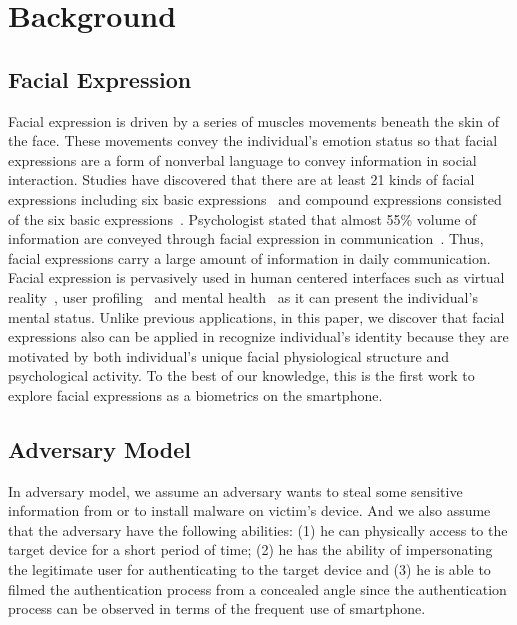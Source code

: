 \section{Background}
    \subsection{Facial Expression}
        Facial expression is driven by a series of muscles movements beneath the skin of the face. These movements convey the individual's emotion status so that facial expressions are a form of nonverbal language to convey information in social interaction. Studies have discovered that there are at least 21 kinds of facial expressions including six basic expressions~\cite{Ekman1972} and compound expressions consisted of the six basic expressions~\cite{Du2014Compound}. Psychologist stated that almost 55\% volume of information are conveyed through facial expression in communication~\cite{Lebow2009Communication}. Thus, facial expressions carry a large amount of information in daily communication. Facial expression is pervasively used in human centered interfaces such as virtual reality~\cite{Bekele2013Understanding}, user profiling~\cite{Arapakis2009Integrating} and mental health~\cite{Acharya2012Impact} as it can present the individual's mental status. Unlike previous applications, in this paper, we discover that facial expressions also can be applied in recognize individual's identity because they are motivated by both individual's unique facial physiological structure and psychological activity. To the best of our knowledge, this is the first work to explore facial expressions as a biometrics on the smartphone.
    \subsection{Adversary Model}
        In adversary model, we assume an adversary wants to steal some sensitive information from or to install malware on victim's device. And we also assume that the adversary have the following abilities: (1) he can physically access to the target device for a short period of time; (2) he has the ability of impersonating the legitimate user for authenticating to the target device and (3) he is able to filmed the authentication process from a concealed angle
        since the authentication process can be observed in terms of the frequent use of smartphone. 
        
